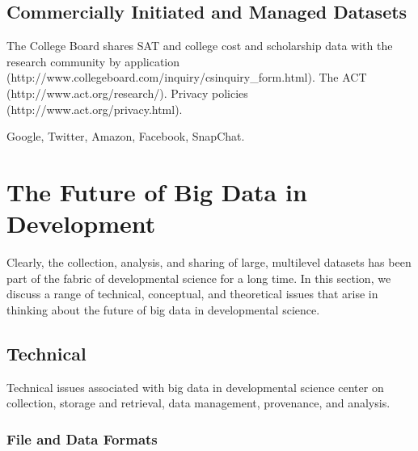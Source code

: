 \documentclass[letterpaper,man,apacite]{apa6}
\begin{document}
\subsection{Commercially Initiated and Managed Datasets}

The College Board shares SAT and college cost and scholarship data with the research community by application (http://www.collegeboard.com/inquiry/csinquiry_form.html).
The ACT (http://www.act.org/research/). Privacy policies (http://www.act.org/privacy.html). 

Google, Twitter, Amazon, Facebook, SnapChat.

\section{The Future of Big Data in Development}

Clearly, the collection, analysis, and sharing of large, multilevel datasets has been part of the fabric of developmental science for a long time.
In this section, we discuss a range of technical, conceptual, and theoretical issues that arise in thinking about the future of big data in developmental science. 

\subsection{Technical}

Technical issues associated with big data in developmental science center on collection, storage and retrieval, data management, provenance, and analysis. 

\subsubsection{File and Data Formats}
\end{document}
